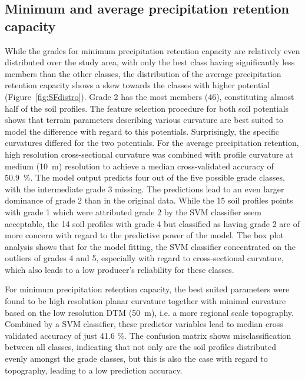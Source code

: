\documentclass[soilsystems,article,submit,moreauthors,pdftex,10pt,a4paper]{Definitions/mdpi}
\begin{document}
\subsection{Minimum and average precipitation retention capacity}
While the grades for minimum precipitation retention capacity are relatively even distributed over the study area, with only the best class having significantly less members than the other classes, the distribution of the average precipitation retention capacity shows a skew towards the classes with higher potential (Figure~\ref{fig:SFdistro}). Grade 2 has the most members (46), constituting almost half of the soil profiles. The feature selection procedure for both soil potentials shows that terrain parameters describing various curvature are best suited to model the difference with regard to this potentials. Surprisingly, the specific curvatures differed for the two potentials. For the average precipitation retention, high resolution cross-sectional curvature was combined with profile curvature at medium (10~m) resolution to achieve a median cross-validated accuracy of 50.9~\%. The model output predicts four out of the five possible grade classes, with the intermediate grade 3 missing. The predictions lead to an even larger dominance of grade 2 than in the original data. While the 15 soil profiles points with grade 1 which were attributed grade 2 by the SVM classifier seem acceptable, the 14 soil profiles with grade 4 but classified as having grade 2 are of more concern with regard to the predictive power of the model. The box plot analysis shows that for the model fitting, the SVM classifier concentrated on the outliers of  grades 4 and 5, especially with regard to cross-sectional curvature, which also leads to a low producer's reliability for these classes. 

For minimum precipitation retention capacity, the best suited parameters were found to be high resolution planar curvature together with minimal curvature based on the low resolution DTM (50~m), i.e. a more regional scale topography. Combined by a SVM classifier, these predictor variables lead to median cross validated accuracy of just 41.6 \%. The confusion matrix shows misclassification between all classes, indicating that not only are the soil profiles distributed evenly amongst the grade classes, but this is also the case with regard to topography, leading to a low prediction accuracy.
\end{document}

